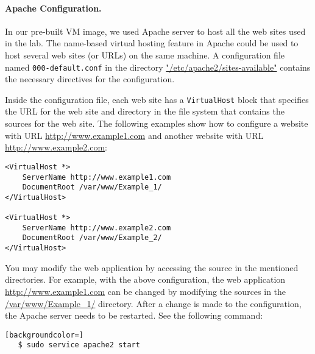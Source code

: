 
\paragraph{Apache Configuration.}
In our pre-built VM image, we used Apache server to host all the web
sites used in the lab. The name-based virtual hosting feature in
Apache could be used to host several web sites (or URLs) on the same
machine. A configuration file named \texttt{000-default.conf} in the directory
\url{"/etc/apache2/sites-available"} contains the necessary directives for the
configuration.

Inside the configuration file, each web site has a {\tt VirtualHost} block
that specifies the URL for the web site and directory in the file system
that contains the sources for the web site. The following examples show how
to configure a website with URL \url{http://www.example1.com} and another
website with URL \url{http://www.example2.com}:

\begin{lstlisting}
<VirtualHost *>
    ServerName http://www.example1.com
    DocumentRoot /var/www/Example_1/
</VirtualHost>

<VirtualHost *>
    ServerName http://www.example2.com
    DocumentRoot /var/www/Example_2/
</VirtualHost>
\end{lstlisting}


You may modify the web application by accessing the source in the
mentioned directories. For example, with the above configuration,
the web application \url{http://www.example1.com} can be changed by modifying
the sources in the \url{/var/www/Example_1/} directory. After a change is
made to the configuration, the Apache server needs to be restarted. See the
following command:

\begin{lstlisting}[backgroundcolor=]
   $ sudo service apache2 start
\end{lstlisting}

